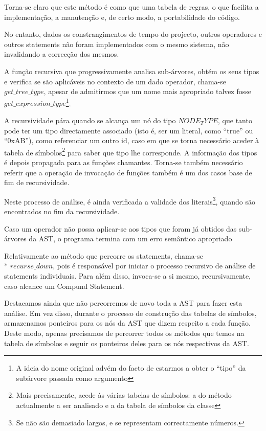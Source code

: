 \documentclass[11pt,a4paper]{article}
\begin{document}
	Torna-se claro que este método é como que uma tabela de regras, o que facilita a implementação, a manutenção e, de certo modo, a portabilidade do código.
	
	No entanto, dados os constrangimentos de tempo do projecto, outros operadores e outros statements não foram implementados com o mesmo sistema, não invalidando a correcção dos mesmos.
	
	A função recursiva que progressivamente analisa sub-árvores, obtém os seus tipos e verifica se são aplicáveis no contexto de um dado operador, chama-se $get\_tree\_type$, apesar de admitirmos que um nome mais apropriado talvez fosse $get\_expression\_type$\footnote{A ideia do nome original advém do facto de estarmos a obter o ``tipo'' da subárvore passada como argumento}.
	
	A recursividade pára quando se alcança um nó do tipo $NODE_TYPE$, que tanto pode ter um tipo directamente associado (isto é, ser um literal, como ``true'' ou ``0xAB''), como referenciar um outro id, caso em que se torna necessário aceder à tabela de símbolos\footnote{Mais precisamente, acede às várias tabelas de símbolos: a do método actualmente a ser analisado e a da tabela de símbolos da classe} para saber que tipo lhe corresponde. A informação dos tipos é depois propagada para as funções chamantes. Torna-se também necessário referir que a operação de invocação de funções também é um dos casos base de fim de recursividade. 
	
	Neste processo de análise, é ainda verificada a validade dos literais\footnote{Se não são demasiado largos, e se representam correctamente números.}, quando são encontrados no fim da recursividade.
	
	Caso um operador não possa aplicar-se aos tipos que foram já obtidos das sub-árvores da AST, o programa termina com um erro semântico apropriado
	
	Relativamente ao método que percorre os statements, chama-se \\* $recurse\_down$, pois é responsável por iniciar o processo recursivo de análise de statements individuais. Para além disso, invoca-se a si mesmo, recursivamente, caso alcance um Compund Statement.
	
	Destacamos ainda que não percorremos de novo toda a AST para fazer esta análise. Em vez disso, durante o processo de construção das tabelas de símbolos, armazenamos ponteiros para os nós da AST que dizem respeito a cada função. Deste modo, apenas precisamos de percorrer todos os métodos que temos na tabela de símbolos e seguir os ponteiros deles para os nós respectivos da AST.
	
\end{document}
